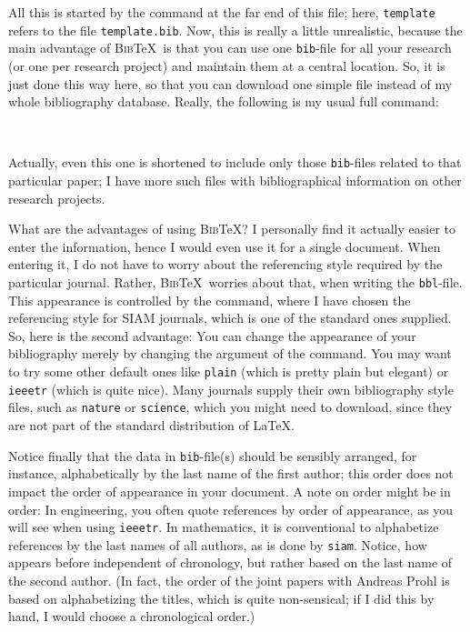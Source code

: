 \documentclass[12pt]{article}
\numberwithin{equation}{section}
\numberwithin{table}{section}
\numberwithin{figure}{section}
\begin{document}
All this is started by the \verb++ command
at the far end of this file; here, \verb+template+ refers to the file
\verb+template.bib+. Now, this is really a little unrealistic, because
the main advantage of \textsc{Bib}\TeX\ is that you can use one
\verb+bib+-file for all your research (or one per research project)
and maintain them at a central location. So, it is just done this way
here, so that you can download one simple file instead of my whole
bibliography database. Really, the following is my usual full command:
\begin{verbatim}
  
\end{verbatim}
Actually, even this one is shortened to include only those \verb+bib+-files
related to that particular paper; I have more such files with bibliographical
information on other research projects.

What are the advantages of using \textsc{Bib}\TeX? I personally find
it actually easier to enter the information, hence I would even use it
for a single document. When entering it, I do not have to worry about the
referencing style required by the particular journal. Rather, \textsc{Bib}\TeX\
worries about that, when writing the \verb+bbl+-file. This appearance
is controlled by the \verb++ command, where I
have chosen the referencing style for SIAM journals, which is one of
the standard ones supplied. So, here is the second advantage: You can
change the appearance of your bibliography merely by changing the
argument of the \verb++ command. You may want to try
some other default ones like \verb+plain+ (which is pretty plain but elegant)
or \verb+ieeetr+ (which is quite nice).
Many journals supply their own bibliography style files,
such as \verb+nature+ or \verb+science+,
which you might need to download, since they are not part of the
standard distribution of \LaTeX.

Notice finally that the data in \verb+bib+-file(s) should be sensibly
arranged, for instance, alphabetically by the last name of the first
author; this order does not impact the order of appearance in your
document. A note on order might be in order: In engineering, you
often quote references by order of appearance, as you will see when
using \verb+ieeetr+. In mathematics, it is conventional to alphabetize
references by the last names of all authors, as is done by \verb+siam+.
Notice, how \cite{GoPr1} appears before \cite{Gobbert} independent of
chronology, but rather based on the last name of the second author.
(In fact, the order of the joint papers with Andreas Prohl is based on
alphabetizing the titles, which is quite non-sensical; if I did this
by hand, I would choose a chronological order.)
\end{document}
